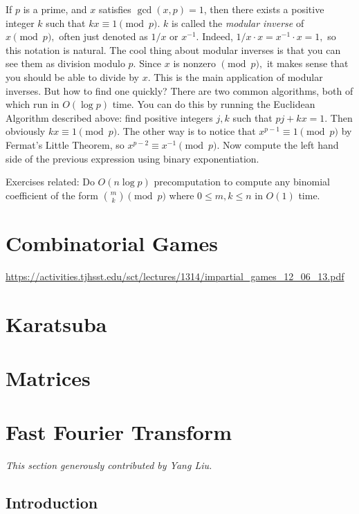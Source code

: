 If $p$ is a prime, and $x$ satisfies $\gcd(x, p) = 1$, then there exists a positive integer $k$ such that $kx \equiv 1 \pmod{p}.$ $k$ is called the \emph{modular inverse} of $x \pmod{p},$ often just denoted as $1/x$ or $x^{-1}.$ Indeed, $1/x \cdot x = x^{-1} \cdot x = 1,$ so this notation is natural. The cool thing about modular inverses is that you can see them as division modulo $p.$ Since $x$ is nonzero $\pmod{p},$ it makes sense that you should be able to divide by $x.$ This is the main application of modular inverses. But how to find one quickly? There are two common algorithms, both of which run in $O(\log p)$ time. You can do this by running the Euclidean Algorithm described above: find positive integers $j, k$ such that $pj + kx = 1.$ Then obviously $kx \equiv 1 \pmod{p}.$ The other way is to notice that $x^{p-1} \equiv 1 \pmod{p}$ by Fermat's Little Theorem, so $x^{p-2} \equiv x^{-1} \pmod{p}.$ Now compute the left hand side of the previous expression using binary exponentiation.

Exercises related: Do $O(n \log p)$ precomputation to compute any binomial coefficient of the form $\binom{m}{k} \pmod{p}$ where $0 \le m, k \le n$ in $O(1)$ time.

\section{Combinatorial Games}

\url{https://activities.tjhsst.edu/sct/lectures/1314/impartial_games_12_06_13.pdf}

\section{Karatsuba}

\section{Matrices}

\section{Fast Fourier Transform}

\textit{This section generously contributed by Yang Liu.}

\subsection{Introduction}

